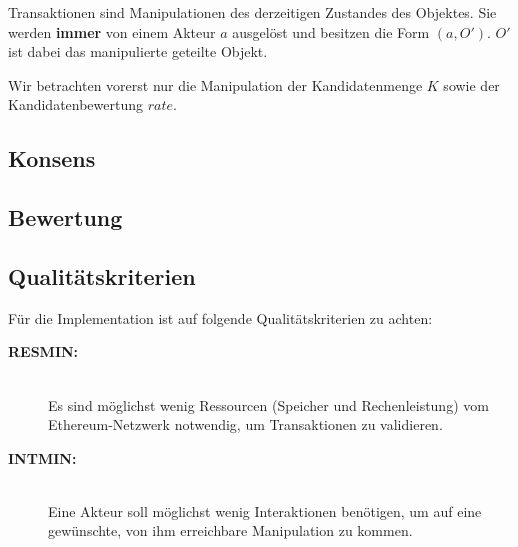 \documentclass[]{article}
\begin{document}
Transaktionen sind Manipulationen des derzeitigen Zustandes des Objektes. Sie werden \textbf{immer} von einem Akteur $a$ ausgelöst und besitzen die Form $(a, O')$. $O'$ ist dabei das manipulierte geteilte Objekt.

Wir betrachten vorerst nur die Manipulation der Kandidatenmenge $K$ sowie der Kandidatenbewertung $rate$. 





\subsection{Konsens}


% 
% 
% 


\subsection {Bewertung}


\subsection {Qualitätskriterien}

Für die Implementation ist auf folgende Qualitätskriterien zu achten:

\begin{description} 
  \item[\textbf{RESMIN:}]\hfill \\
    Es sind möglichst wenig Ressourcen (Speicher und Rechenleistung) vom Ethereum-Netzwerk notwendig, um Transaktionen zu validieren.
  \item[\textbf{INTMIN:}]\hfill \\
    Eine Akteur soll möglichst wenig Interaktionen benötigen, um auf eine gewünschte, von ihm erreichbare Manipulation zu kommen.
\end{description}
\end{document}
